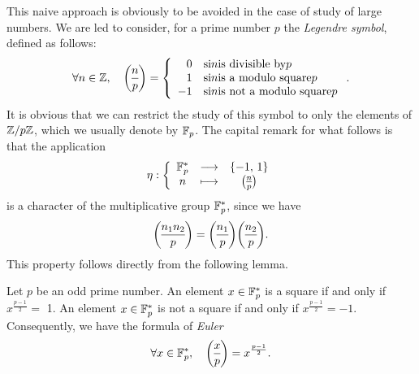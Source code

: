  
  This naive approach is obviously to be avoided in the case of study of large numbers. We are led to consider, for a prime number $ p $ the \textit{Legendre symbol}, defined as follows: \label{notation-25}
\begin{equation*}
\forall n \in \ZZ, \quad \legsymb{n}{p} = \left\{\begin{array}{rl} 0 & \text{si} n \text{is divisible by} p \\1 & \text{si} n \text{is a modulo square} p \\-1 & \text{si} n \text{is not a modulo square} p \end{array} \right. .
\end{equation*}
It is obvious that we can restrict the study of this symbol to only the elements of $ \mathbb{Z}/p \mathbb{Z} $, which we usually denote by $ \mathbb{F}_p $. The capital remark for what follows is that the application
\begin{equation}
\label{eq-defn-cartactere-eta}
\eta: \func{\FF_p^*}{\{- 1, \, 1\}}{n}{\legsymb{n}{p}}
\end{equation}
is a character of the multiplicative group $ \mathbb{F}_p^* $, since we have
\begin{equation*}
\legsymb{n_1 n_2}{p} = \legsymb{n_1}{p} \legsymb{n_2}{p}.
\end{equation*}
This property follows directly from the following lemma.
 
\begin{lem}
\label{lem-formula-euler}
  Let $ p $ be an odd prime number. An element $ x \in \mathbb{F}_p^* $ is a square if and only if $ x^{\frac{p-1}{2}} = $ 1. An element $ x \in \mathbb{F}_p^* $ is not a square if and only if $ x^{\frac{p-1}{2}} = -1 $. Consequently, we have the formula of \textit{Euler}
\begin{equation*}
\forall x \in \FF_p^*, \quad \legsymb{x}{p} = x^{\frac{p-1}{2}}.
\end{equation*}
\end{lem}
 
